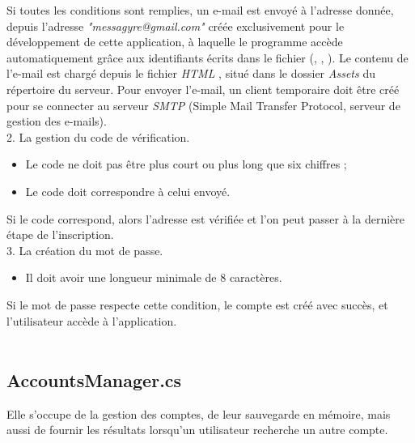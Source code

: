 \documentclass{article}
\begin{document}
Si toutes les conditions sont remplies, un e-mail est envoyé à l’adresse donnée, depuis l’adresse \textit{"messagyre@gmail.com"} créée exclusivement pour le développement de cette application, à laquelle le programme accède automatiquement grâce aux identifiants écrits dans le fichier (, , ). Le contenu de l’e-mail est chargé depuis le fichier \textit{HTML} , situé dans le dossier \textit{Assets} du répertoire du serveur. Pour envoyer l’e-mail, un client temporaire doit être créé pour se connecter au serveur \textit{SMTP} (Simple Mail Transfer Protocol, serveur de gestion des e-mails).
\\

2. La gestion du code de vérification.

\begin{itemize}
    \item Le code ne doit pas être plus court ou plus long que six chiffres ;
    \item Le code doit correspondre à celui envoyé.
\end{itemize}

Si le code correspond, alors l’adresse est vérifiée et l’on peut passer à la dernière étape de l’inscription.
\\

3. La création du mot de passe.

\begin{itemize}
    \item Il doit avoir une longueur minimale de 8 caractères.
\end{itemize}

Si le mot de passe respecte cette condition, le compte est créé avec succès, et l’utilisateur accède à l’application.
\\\\

\subsection{AccountsManager.cs}
Elle s’occupe de la gestion des comptes, de leur sauvegarde en mémoire, mais aussi de fournir les résultats lorsqu’un utilisateur recherche un autre compte.
\end{document}
